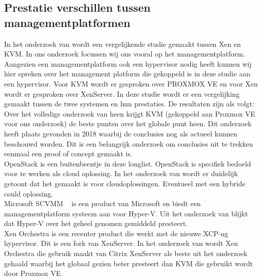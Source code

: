 \subsection{Prestatie verschillen tussen managementplatformen}
In het onderzoek van \textcite{algarni2018performance} wordt een vergelijkende studie gemaakt tussen Xen en KVM. In ons onderzoek focussen wij ons vooral op het managementplatform.
Aangezien een managementplatform ook een hypervisor nodig heeft kunnen wij hier spreken over het management platform die gekoppeld is in deze studie aan een hypervisor.
Voor KVM wordt er gesproken over PROXMOX VE en voor Xen wordt er gesproken over XenServer. In deze studie wordt er een vergelijking gemaakt tussen de twee systemen en hun prestaties. De resultaten zijn als volgt:
Over het volledige onderzoek van \textcite{algarni2018performance} heen krijgt KVM (gekoppeld aan Proxmox VE voor ons onderzoek) de beste punten over het globale punt heen. Dit onderzoek heeft plaats gevonden in 2018 waarbij de conclusies nog als actueel kunnen beschouwd worden.
Dit is een belangrijk onderzoek om conclusies uit te trekken eenmaal een proof of concept gemaakt is. \\
OpenStack is een buitenbeentje in deze longlist. OpenStack is specifiek bedoeld voor te werken als cloud oplossing. In het onderzoek van \textcite{callegati2014performance} wordt er duidelijk getoont dat het gemaakt is voor cloudoplossingen. Eventueel met een hybride could oplossing. \\
Microsoft SCVMM ~\autocite{microsoftvmm2025}  is een product van Microsoft en biedt een managementplatform systeem aan voor Hyper-V. Uit het onderzoek van \textcite{fayyad2013benchmarking} blijkt dat Hyper-V over het geheel genomen gemiddeld presteert. \\
Xen Orchestra is een recenter product die werkt met de nieuwe XCP-ng hypervisor. Dit is een fork van XenServer. In het onderzoek van \textcite{el2021server} wordt Xen Orchestra die gebruik maakt van Citrix XenServer als beste uit het onderzoek gehaald waarbij het globaal gezien beter presteert dan KVM die gebruikt wordt door Proxmox VE \\


